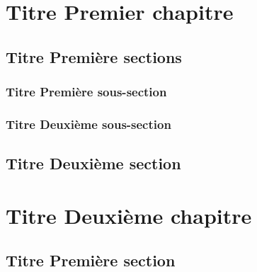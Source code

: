 \documentclass{book}
\begin{document}
\chapter{Titre Premier chapitre}
    \section{Titre Première sections}
    \subsection{Titre Première sous-section}
        \lipsum[1-10]
    \subsection{Titre Deuxième sous-section}
        \lipsum[11-15]
    \section{Titre Deuxième section}
        \lipsum[16-18]
\chapter{Titre Deuxième chapitre}
    \lipsum[19-20]
    \section{Titre Première section}
        \lipsum[21-24]
\end{document}
